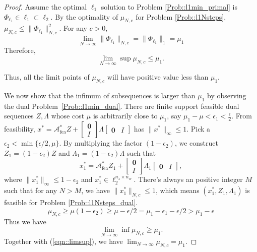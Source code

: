 \begin{proof}
Assume the optimal \(\ell_1\) solution to Problem \ref{Prob::l1min_primal} is \(\Phi_{\ell_1}\in \ell_1 \subset \ell_2\). By the optimality of \(\mu_{N,c}\) for Problem \ref{Prob::l1Nsteps}, \(\mu_{N,c} \leq \|\Phi_{\ell_1}\|_{N,c}^2\).
For any \(c>0\),
\[
\lim_{N\rightarrow \infty} \|\Phi_{\ell_1}\|_{N,c} = \|\Phi_{\ell_1}\|_1 = \mu_1
\]
Therefore,
\begin{equation}\label{eqn::limsup}
    \lim_{N\rightarrow \infty}\sup \mu_{N,c} \leq \mu_1.
\end{equation}

Thus, all the limit points of \(\mu_{N,c}\) will have positive value less than \(\mu_1\). 

We now show that the infimum of subsequences is larger than \(\mu_1\) by observing the dual Problem~\ref{Prob::l1min_dual}. There are finite support feasible dual sequences \(Z,\Lambda\) whose cost \(\mu\) is arbitrarily
close to \(\mu_1\), say \(\mu_1-\mu < \epsilon_1 < \frac{\epsilon}{2}\). From feasibility, \(x^* = \mathcal{A}_{\mathrm{fea}}^* Z + \begin{bmatrix}\mathbf{0} \\ I\end{bmatrix} \Lambda \begin{bmatrix}\mathbf{0} & I \end{bmatrix} \)
has \(\|x^*\|_\infty \leq 1 \). Pick a \(\epsilon_2 < \min\{\epsilon/2,\mu\}\). By multiplying the factor \((1-\epsilon_2)\), we construct \(Z_1 = (1-\epsilon_2) Z\) and \(\Lambda_1 =(1-\epsilon_2) \Lambda\) such that
\[
x_1^* = \mathcal{A}_{\mathrm{fea}}^* Z_1 + \begin{bmatrix}\mathbf{0} \\ I\end{bmatrix} \Lambda_1 \begin{bmatrix}\mathbf{0} & I \end{bmatrix},
\]
where \(\|x_1^*\|_\infty \leq 1- \epsilon_2\) and \(x_1^* \in \ell_2^{n_z\times n_w}\). There's always an positive integer \(M\) such that for any \(N > M\), we have \(\|x_1^*\|_{N,c}\leq 1\), which means \((x_1^*, Z_1, \Lambda_1)\) is feasible for Problem \ref{Prob::l1Nsteps_dual}. 
\[
\mu_{N,c} \geq \mu(1-\epsilon_2) \geq \mu -\epsilon/2 = \mu_1 - \epsilon_1 -\epsilon/2 >\mu_1 -\epsilon
\]
Thus we have
\begin{equation} \label{eqn::liminf}
    \lim_{N\rightarrow \infty}\inf \mu_{N,c} \geq \mu_1.
\end{equation}
Together with (\ref{eqn::limsup}), we have \(\lim_{N\rightarrow \infty} \mu_{N,c} =\mu_1\).
\end{proof}






